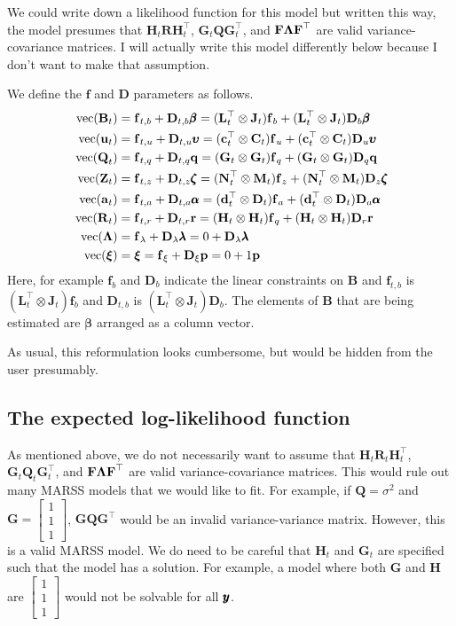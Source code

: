 \documentclass[]{article}
\def\uupsilon{\pmb{\upsilon}}
\def\llambda{\pmb{\lambda}}
\def\bbeta{\pmb{\beta}}
\def\aalpha{\pmb{\alpha}}
\def\zzeta{\pmb{\zeta}}
\def\xixi{\mbox{\boldmath $\xi$}}
\def\PI{\mbox{\boldmath $\Pi$}}
\def\LAM{\mbox{\boldmath $\Lambda$}}
\def\UPS{\mbox{\boldmath $\Upsilon$}}
\def\XI{\mbox{\boldmath $\Xi$}}
\def\ZZ{\mbox{$\mathbf Z$}}	\def\zz{\mbox{$\mathbf z$}}
\def\BB{\mbox{$\mathbf B$}}	\def\bb{\mbox{$\mathbf b$}}
\def\DD{\mbox{$\mathbf D$}}	\def\dd{\mbox{$\mathbf d$}}
\def\FF{\mbox{$\mathbf F$}} \def\ff{\mbox{$\mathbf f$}}
\def\GG{\mbox{$\mathbf G$}}	\def\gg{\mbox{$\mathbf g$}}
\def\HH{\mbox{$\mathbf H$}}	\def\hh{\mbox{$\mathbf h$}}
\def\QQ{\mbox{$\mathbf Q$}}	 \def\qq{\mbox{$\mathbf q$}}
\def\Qb{\mbox{$\mathbf G$}}  \def\Qm{\mathbb{Q}}
\def\RR{\mbox{$\mathbf R$}}	 \def\rr{\mbox{$\mathbf r$}}
\def\Rb{\mbox{$\mathbf H$}}	\def\Rm{\mathbb{R}}
\def\Ub{\mbox{$\mathbf C$}} \def\Ua{\mbox{$\mathbf c$}} \def\Um{\UPS}
\def\Ab{\mbox{$\mathbf D$}} \def\Aa{\mbox{$\mathbf d$}} \def\Am{\PI}
\def\Ba{\mbox{$\mathbf L$}} \def\Bm{\UPS} \def\Bb{\mbox{$\mathbf J$}}
\def\Za{\mbox{$\mathbf N$}} \def\Zm{\XI}
\def\Zb{\mbox{$\mathbf M$}}
\def\vec{\,\textup{\textrm{vec}}}
\begin{document}
We could write down a likelihood function for this model but written this way, the model presumes that $\Rb_t\RR\Rb_t^\top$, $\Qb_t\QQ\Qb_t^\top$, and $\FF\LAM\FF^\top$ are valid variance-covariance matrices.  I will actually write this model differently below because I don't want to make that assumption.

We define the $\ff$ and $\DD$ parameters as follows.
\begin{equation*}
\begin{split}
\vec(\BB_t) &= \ff_{t,b} + \DD_{t,b}\bbeta = (\Ba_t^\top \otimes \Bb_t)\ff_b + (\Ba_t^\top \otimes \Bb_t)\DD_b\bbeta\\
\vec(\uu_t) &= \ff_{t,u} + \DD_{t,u}\uupsilon = (\Ua_t^\top \otimes \Ub_t)\ff_u + (\Ua_t^\top \otimes \Ub_t)\DD_u\uupsilon\\
\vec(\QQ_t) &= \ff_{t,q} + \DD_{t,q}\qq = (\Qb_t \otimes \Qb_t)\ff_q + (\Qb_t \otimes \Qb_t)\DD_q\qq \\
\vec(\ZZ_t) &= \ff_{t,z} + \DD_{t,z}\zzeta = (\Za_t^\top \otimes \Zb_t)\ff_z + (\Za_t^\top \otimes \Zb_t)\DD_z\zzeta\\
\vec(\aa_t) &= \ff_{t,a} + \DD_{t,a}\aalpha = (\Aa_t^\top \otimes \Ab_t)\ff_a + (\Aa_t^\top \otimes \Ab_t)\DD_a\aalpha\\
\vec(\RR_t) &= \ff_{t,r} + \DD_{t,r}\rr = (\Rb_t \otimes \Rb_t)\ff_q + (\Rb_t \otimes \Rb_t)\DD_r\rr\\
\vec(\LAM)&= \ff_\lambda+\DD_\lambda\llambda = 0 + \DD_\lambda\llambda\\
\vec(\xixi)&= \xixi=\ff_\xi+\DD_\xi\pp = 0+1\pp
\end{split}
\end{equation*}
Here, for example $\ff_b$ and $\DD_b$ indicate the linear constraints on $\BB$ and $\ff_{t,b}$ is $(\Ba_t^\top \otimes \Bb_t)\ff_b$ and $\DD_{t,b}$ is $(\Ba_t^\top \otimes \Bb_t)\DD_b$.  The elements of $\BB$ that are being estimated are $\bbeta$ arranged as a column vector.

As usual, this reformulation looks cumbersome, but would be hidden from the user presumably.

\subsection{The expected log-likelihood function}
As mentioned above, we do not necessarily want to assume that $\HH_t\RR_t\HH_t^\top$, $\GG_t\QQ_t\GG_t^\top$, and $\FF\LAM\FF^\top$ are valid variance-covariance matrices.  This would rule out many MARSS models that we would like to fit.  For example, if $\QQ=\sigma^2$ and $\GG=\begin{bmatrix}1\\ 1\\ 1\end{bmatrix}$,  $\GG\QQ\GG^\top$ would be an invalid variance-variance matrix.  However, this is a valid MARSS model. We do need to be careful that $\HH_t$ and $\GG_t$ are specified such that the model has a solution.  For example, a model where both $\GG$ and $\HH$ are $\begin{bmatrix}1\\ 1\\ 1\end{bmatrix}$ would not be solvable for all $\mbox{$\pmb{y}$}$.
\end{document}
